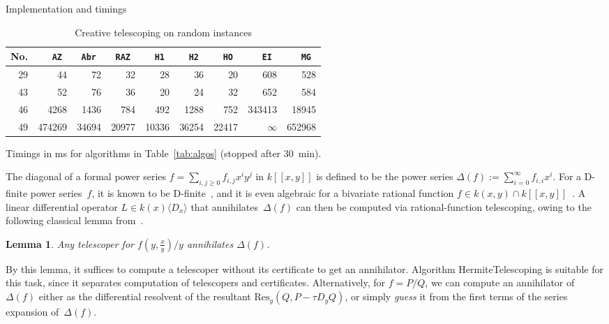 \documentclass{sig-alt-full}
\newtheorem{lemma}{Lemma}
\begin{document}
\begin{section}{Implementation and timings}
\begin{table}
\begin{scriptsize}
\begin{center}
\begin{tabular}{r|rrrrrrrr}
No.& \tt AZ & \tt Abr & \tt RAZ & \tt H1 & \tt H2 & \tt HO & \tt EI & \tt MG \\
\hline
29 & 44 & 72 & 32 & 28 & 36 & 20 & 608 & 528 \\
43 & 52 & 76 & 36 & 20 & 24 & 32 & 652 & 584 \\
46 & 4268 & 1436 & 784 & 492 & 1288 & 752 & 343413 & 18945 \\
49 & 474269 & 34694 & 20977 & 10336 & 36254 & 22417 & $\infty$ & 652968
\end{tabular}
\end{center}
\end{scriptsize}
\vskip-12pt
\caption{Creative telescoping on random instances}\label{tab:random}
\begin{small}
Timings in ms for algorithms in Table~\ref{tab:algos} (stopped after 30~min).
\end{small}
\vskip-10pt
\end{table}


\smallskip{}
The diagonal of a formal power series $f= \sum_{i, j\ge 0}f_{i,j}
x^i y^j$ in $k[[x, y]]$ is defined to be the power series $\Delta(f)
:= \sum_{i=0}^\infty f_{i,i} x^i$.
For a D-finite power series~$f$, it is known to be
D-finite~\cite{Lipshitz1988}, and it is even algebraic
for a bivariate rational function $f \in k(x, y) \cap
k[[x,y]]$~\cite[\S\,6.3]{Stanley1999}.
A linear differential operator $L\in k(x)\langle D_x\rangle$ that
annihilates~$\Delta(f)$ can then be computed via rational-function
telescoping, owing to the following classical lemma from~\cite{Lipshitz1988}.

\vspace{-0.2cm}
\begin{lemma}
Any telescoper for $f(y, \frac{x}{y})/y$ annihilates $\Delta(f)$.
\end{lemma}
By this lemma, it suffices to compute a telescoper without its certificate to get an annihilator.
Algorithm \textsf{HermiteTelescoping} is suitable for
this task, since it separates computation of telescopers and
certificates.
Alternatively, for $f=P/Q$, we can compute an annihilator of
$\Delta(f)$ either as the differential resolvent of the resultant
$\textrm{Res}_y(Q,P-\tau D_yQ)$, or simply \emph{guess\/} it from the
first terms of the series expansion of~$\Delta(f)$.


\end{section}
\end{document}

